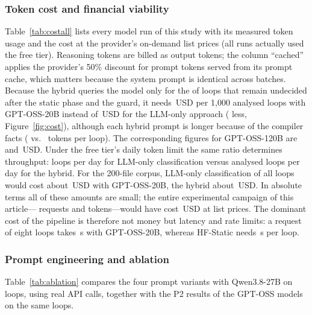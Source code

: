 \subsubsection{Token cost and financial viability}
\label{sec:rq-cost}
Table~\ref{tab:costall} lists every model run of this study with its measured token usage and the cost at the provider's on-demand list prices (all runs actually used the free tier). Reasoning tokens are billed as output tokens; the column ``cached'' applies the provider's 50\% discount for prompt tokens served from its prompt cache, which matters because the system prompt is identical across batches. Because the hybrid queries the model only for the \projFracTwenty{} of loops that remain undecided after the static phase and the guard, it needs \projHTwenty{}\,USD per 1{,}000 analysed loops with GPT-OSS-20B instead of \projAITwenty{}\,USD for the LLM-only approach (\projSaveTwenty{} less, Figure~\ref{fig:cost}), although each hybrid prompt is longer because of the compiler facts (\tokTwentyHUnk{} vs.\ \tokTwentyPTwoEval{} tokens per loop). The corresponding figures for GPT-OSS-120B are \projHOneTwenty{} and \projAIOneTwenty{}\,USD. Under the free tier's daily token limit the same ratio determines throughput: \dayCapAITwenty{} loops per day for LLM-only classification versus \dayCapHTwenty{} analysed loops per day for the hybrid. For the 200-file corpus, LLM-only classification of all \fieldLoops{} loops would cost about \fieldAIUSD{}\,USD with GPT-OSS-20B, the hybrid about \fieldHUSD{}\,USD. In absolute terms all of these amounts are small; the entire experimental campaign of this article---\totRequests{} requests and \totTokens{} tokens---would have cost \totUSD{}\,USD at list prices. The dominant cost of the pipeline is therefore not money but latency and rate limits: a request of eight loops takes \latTwentyHUnk{}\,s with GPT-OSS-20B, whereas HF-Static needs \staticUsPerLoop{}\,\textmu s per loop.




\subsubsection{Prompt engineering and ablation}
\label{sec:rq-prompt}
Table~\ref{tab:ablation} compares the four prompt variants with Qwen3.8-27B on \nAblLoops{} loops, using real API calls, together with the P2 results of the GPT-OSS models on the same loops. \ablationText{}



